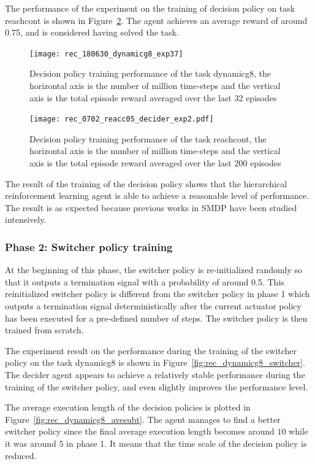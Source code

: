 The performance of the experiment on the training of decision policy on task reachcont is shown in Figure~\ref{fig:rec_reachc05_decider_subt10}. The agent achieves an average reward of around 0.75, and is considered having solved the task.


\begin{figure}[!htbp]
\centering
\texttt{[image: rec\_180630\_dynamicg8\_exp37]}
\caption{Decision policy training performance of the task dynamicg8, the horizontal axis is the number of million time-steps and the vertical axis is the total episode reward averaged over the last 32 episodes}
\label{fig:rec_dynamicg8_decider_subt10}
\end{figure}


\begin{figure}
\centering
\texttt{[image: rec\_0702\_reacc05\_decider\_exp2.pdf]}
\caption{Decision policy training performance of the task reachcont, the horizontal axis is the number of million time-steps and the vertical axis is the total episode reward averaged over the last 200 episodes}
\label{fig:rec_reachc05_decider_subt10}
\end{figure}

The result of the training of the decision policy shows that the hierarchical reinforcement learning agent is able to achieve a reasonable level of performance. The result is as expected because previous works in SMDP have been studied intensively.

\subsubsection{Phase 2: Switcher policy training}
At the beginning of this phase, the switcher policy is re-initialized randomly so that it outputs a termination signal with a probability of around 0.5. This reinitialized switcher policy is different from the switcher policy in phase 1 which outputs a termination signal deterministically after the current actuator policy has been executed for a pre-defined number of steps. The switcher policy is then trained from scratch.

The experiment result on the performance during the training of the switcher policy on the task dynamicg8 is shown in Figure~\ref{fig:rec_dynamicg8_switcher}. The decider agent appears to achieve a relatively stable performance during the training of the switcher policy, and even slightly improves the performance level.

The average execution length of the decision policies is plotted in Figure~\ref{fig:rec_dynamicg8_avesubt}. The agent manages to find a better switcher policy since the final average execution length becomes around $10$ while it was around $5$ in phase 1. It means that the time scale of the decision policy is reduced.

